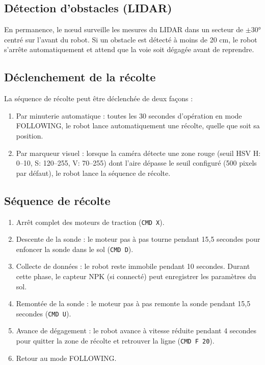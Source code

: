\documentclass [12pt, a4paper]{article}
\begin{document}
\subsection{Détection d'obstacles (LIDAR)}
En permanence, le nœud surveille les mesures du LIDAR dans un secteur de $\pm30°$ centré sur l'avant du robot. Si un obstacle est détecté à moins de 20 cm, le robot s'arrête automatiquement et attend que la voie soit dégagée avant de reprendre.

\subsection{Déclenchement de la récolte}

La séquence de récolte peut être déclenchée de deux façons :

\begin{enumerate}
    \item Par minuterie automatique : toutes les 30 secondes d'opération en mode FOLLOWING, le robot lance automatiquement une récolte, quelle que soit sa position.
    \item Par marqueur visuel : lorsque la caméra détecte une zone rouge (seuil HSV H: 0--10, S: 120--255, V: 70--255) dont l'aire dépasse le seuil configuré (500 pixels par défaut), le robot lance la séquence de récolte.
\end{enumerate}

\subsection{Séquence de récolte}
\begin{enumerate}
    \item Arrêt complet des moteurs de traction (\texttt{CMD X}).
    \item Descente de la sonde : le moteur pas à pas tourne pendant 15,5 secondes pour enfoncer la sonde dans le sol (\texttt{CMD D}).
    \item Collecte de données : le robot reste immobile pendant 10 secondes. Durant cette phase, le capteur NPK (si connecté) peut enregistrer les paramètres du sol.
    \item Remontée de la sonde : le moteur pas à pas remonte la sonde pendant 15,5 secondes (\texttt{CMD U}).
    \item Avance de dégagement : le robot avance à vitesse réduite pendant 4 secondes pour quitter la zone de récolte et retrouver la ligne (\texttt{CMD F 20}).
    \item Retour au mode FOLLOWING.
\end{enumerate}
\end{document}
